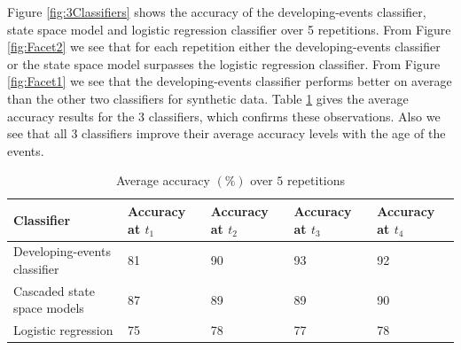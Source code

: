 \documentclass[a4paper,11pt]{article}
\begin{document}
Figure \ref{fig:3Classifiers} shows the accuracy of the developing-events classifier, state space model and logistic regression classifier over 5 repetitions. 	From Figure \ref{fig:Facet2} we see that for each repetition either the developing-events classifier or the state space model surpasses the logistic regression classifier. From Figure \ref{fig:Facet1} we see that the developing-events classifier performs better on average than the other two classifiers for synthetic data. Table \ref{tab:Results_Synthetic} gives the average accuracy results for the 3 classifiers, which confirms these observations. Also we see that all 3 classifiers improve their average accuracy levels with the age of the events.

\begin{table}[H]
	\centering
	\caption{Average accuracy $(\%)$ over $5$ repetitions }
	\footnotesize
	\begin{tabular}{p{6cm}p{1cm}p{1cm}p{1cm}p{1cm}}
		\toprule
		Classifier                   & Accuracy at $t_1$ & Accuracy at $t_2$ & Accuracy at $t_3$ & Accuracy at $t_4$ \\
		\midrule
		Developing-events classifier & 81                & 90                & 93                & 92                \\
		Cascaded state space models  & 87                & 89                & 89                & 90                \\
		Logistic regression          & 75                & 78                & 77                & 78                \\
		\bottomrule
	\end{tabular}
	\label{tab:Results_Synthetic}
\end{table}
\end{document}
